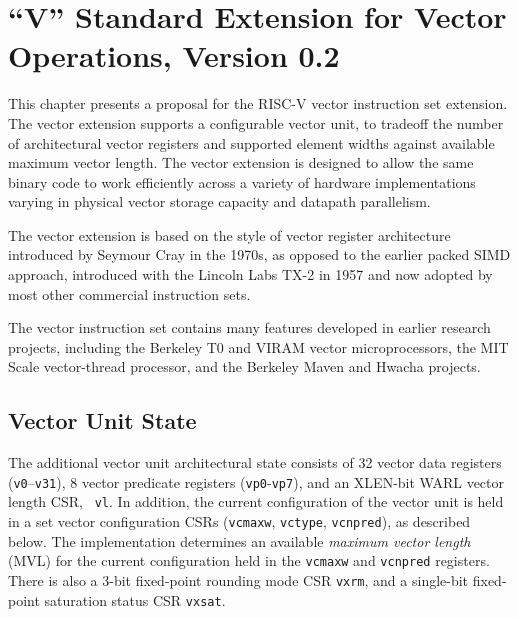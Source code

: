 \chapter{``V'' Standard Extension for Vector Operations, Version 0.2}
\label{sec:bits}

This chapter presents a proposal for the RISC-V vector instruction set
extension.  The vector extension supports a configurable vector unit,
to tradeoff the number of architectural vector registers and supported
element widths against available maximum vector length.  The vector
extension is designed to allow the same binary code to work
efficiently across a variety of hardware implementations varying in
physical vector storage capacity and datapath parallelism.

\begin{commentary}
The vector extension is based on the style of vector register
architecture introduced by Seymour Cray in the 1970s, as opposed to
the earlier packed SIMD approach, introduced with the Lincoln Labs
TX-2 in 1957 and now adopted by most other commercial instruction
sets.

The vector instruction set contains many features developed in earlier
research projects, including the Berkeley T0 and VIRAM vector
microprocessors, the MIT Scale vector-thread processor, and the
Berkeley Maven and Hwacha projects.
\end{commentary}

\section{Vector Unit State}

The additional vector unit architectural state consists of 32 vector
data registers ({\tt v0}--{\tt v31}), 8 vector predicate registers
({\tt vp0}-{\tt vp7}), and an XLEN-bit WARL vector length CSR, {\tt
  vl}.  In addition, the current configuration of the vector unit is
held in a set vector configuration CSRs ({\tt vcmaxw}, {\tt vctype},
{\tt vcnpred}), as described below.  The implementation determines an
available {\em maximum vector length} (MVL) for the current
configuration held in the {\tt vcmaxw} and {\tt vcnpred} registers.
There is also a 3-bit fixed-point rounding mode CSR {\tt vxrm}, and a
single-bit fixed-point saturation status CSR {\tt vxsat}.

